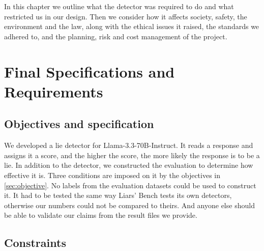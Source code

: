 \label{chap:req}

In this chapter we outline what the detector was required to do and what restricted us in our
design. Then we consider how it affects society, safety, the environment and the law, along with
the ethical issues it raised, the standards we adhered to, and the planning, risk and cost
management of the project.

\section{Final Specifications and Requirements}
\label{sec:specs}

\subsection{Objectives and specification}

We developed a lie detector for Llama-3.3-70B-Instruct. It reads a response and assigns it a
score, and the higher the score, the more likely the response is to be a lie. In addition to the
detector, we constructed the evaluation to determine how effective it is. Three conditions are
imposed on it by the objectives in \cref{sec:objective}. No labels from the evaluation datasets could be
used to construct it. It had to be tested the same way Liars' Bench tests its own detectors,
otherwise our numbers could not be compared to theirs. And anyone else should be able to
validate our claims from the result files we provide.

\subsection{Constraints}

